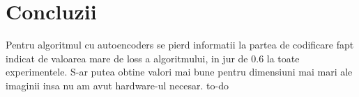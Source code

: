 \documentclass{article}
\begin{document}
\section{Concluzii}

Pentru algoritmul cu autoencoders se pierd informatii la partea de codificare fapt indicat de valoarea mare de loss a algoritmului, in jur de 0.6 la toate experimentele. S-ar putea obtine valori mai bune pentru dimensiuni mai mari ale imaginii insa nu am avut hardware-ul necesar.
to-do

\newpage
 

\end{document}
